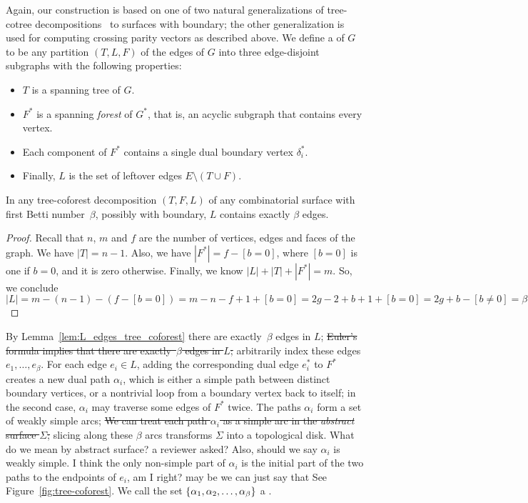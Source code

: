 \documentclass[letterpaper,review]{siamart190516}
\def\dualarc{\alpha}
\def\modified#1{\color{blue}#1 \color{black}}
\begin{document}
Again, our construction is based on one of two natural generalizations of tree-cotree
decompositions~\cite{e-dgteg-03} to surfaces with boundary; the other generalization is used for
computing crossing parity vectors as described above.
We define a  of $G$ to be any partition $(T, L, F)$ of the edges of $G$ into three edge-disjoint subgraphs with the following properties:
\begin{itemize}\itemsep0pt
\item $T$ is a spanning tree of $G$.
\item $F^*$ is a spanning \emph{forest} of $G^*$, that is, an acyclic subgraph that contains every vertex.
\item Each component of $F^*$ contains a single dual boundary vertex $\delta_i^*$.
\item Finally, $L$ is the set of leftover edges $E \setminus (T\cup F)$.
\end{itemize}
%
\begin{lemma}
\label{lem:L_edges_tree_coforest}
In any tree-coforest decomposition $(T, F, L)$ of any combinatorial surface with first Betti number~$\beta$, possibly with boundary, $L$ contains exactly $\beta$ edges.
\end{lemma}
\begin{proof}
Recall that $n$, $m$ and $f$ are the number of vertices, edges and faces of the graph.
We have $|T| = n-1$.  Also, we have $|F^*| = f-[b=0]$, where $[b=0]$ is one if $b=0$, and it is zero otherwise.  Finally, we know $|L| + |T| + |F^*| = m$.
So, we conclude
\[
|L| = m - (n-1) - (f - [b=0]) = m - n - f + 1 + [b=0] = 2g - 2 + b + 1 + [b = 0] = 2g + b - [b\neq 0] = \beta 
\]
\end{proof}

\modified{
By Lemma~\ref{lem:L_edges_tree_coforest} there are exactly~$\beta$ edges in $L$;
}
\sout{Euler's formula implies that there are exactly~$\beta$ edges in $L$;} arbitrarily index these edges $e_1, \dots, e_\beta$.  For each edge $e_i\in L$, adding the corresponding dual edge $e_i^*$ to $F^*$ creates a new dual path $\dualarc_i$, which is either a simple path between distinct boundary vertices, or a nontrivial loop from a boundary vertex back to itself; in the second case, $\dualarc_i$ may traverse some edges of $F^*$ twice.  
\modified{The paths $\dualarc_i$ form a set of weakly simple arcs;}
\sout{We can treat each path $\dualarc_i$ as a simple arc in the \emph{abstract} surface $\Sigma$;} slicing along these $\beta$ arcs transforms $\Sigma$ into a topological disk. \modified{What do we mean by abstract surface? a reviewer asked? Also, should we say $\alpha_i$ is weakly simple.  I think the only non-simple part of $\alpha_i$ is the initial part of the two paths to the endpoints of $e_i$, am I right? may be we can just say that}
See Figure~\ref{fig:tree-coforest}.  We call the set $\set{\dualarc_1, \dualarc_2, \dots, \dualarc_\beta}$ a .
\end{document}
